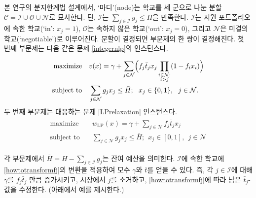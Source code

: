 \documentclass[11pt]{article} %
\newif\ifen
\theoremstyle{definition}
\theoremstyle{definition}
\begin{document}
\ifen In our branch-and-bound framework, a \emph{node} is characterized by a three-way partition of schools $\mathcal{C}= \mathcal{I} \cup \mathcal{O} \cup \mathcal{N}$ satisfying $\sum_{j \in \mathcal{I}} g_j \leq H$. $\mathcal{I}$ consists of schools that are ``in'' the application portfolio ($x_j = 1$), $\mathcal{O}$ consists of those that are ``out'' ($x_j = 0$), and $\mathcal{N}$ consists of those that are ``negotiable.'' 
The choice of partition induces a pair of subproblems. The first subproblem is an instance of Problem \ref{integernlp}, namely
\else
본 연구의 분지한계법 설계에서, `마디'(node)는 학교를 세 군으로 나눈 분할 $\mathcal{C}= \mathcal{I} \cup \mathcal{O} \cup \mathcal{N}$로 묘사한다. 단, $\mathcal{I}$는 $\sum_{j \in \mathcal{I}} g_j \leq H$을 만족한다. $\mathcal{I}$는 지원 포트폴리오에 속한 학교(`in': $x_j = 1$), $\mathcal{O}$는 속하지 않은 학교(`out': $x_j = 0$), 그리고 $\mathcal{N}$은 미결의 학교(`negotiable')로 이루어진다. 분할이 결정되면 부문제의 한 쌍이 결정해진다. 첫 번째 부문제는 다음 같은 문제 \ref{integernlp}의 인스턴스다.
\fi
\begin{align} \label{nodenlpsubproblem}
\begin{split}
\text{maximize}\quad &  v(x) = \gamma + \sum_{j \in \mathcal{N}} \Bigl(f_j \bar t_j x_j \prod_{\substack{i \in \mathcal{N}:\\i > j}} (1 - f_{i} x_i) \Bigr)\\
\text{subject to}\quad & \sum_{j \in \mathcal{N}} g_j x_j \leq \bar H; ~~ x_j \in \{0, 1\},~~j \in \mathcal{N}.
\end{split}
\end{align}
\ifen The second is the corresponding instance of Problem \ref{LPrelaxation}:
\else 두 번째 부문제는 대응하는 문제 \ref{LPrelaxation} 인스턴스다.\fi
\begin{align} \label{nodelprelaxation}
\begin{split}
\text{maximize}\quad &  w_{\mathrm{LP}}(x)= \gamma + \sum_{j \in \mathcal{N}}  f_j \bar t_j  x_j \\
\text{subject to}\quad & \sum_{j \in \mathcal{N}} g_j x_j \leq \bar H; ~~ x_j \in [0, 1],~~j \in \mathcal{N}
\end{split}
\end{align}
\ifen
In both subproblems, $\bar H = H - \sum_{j\in \mathcal{I}} g_j$ denotes the residual budget. The parameters $\gamma$ and $\bar t$ are obtained by iteratively applying the transformation \eqref{howtotransformfj} to the schools in $\mathcal{I}$. For each $j\in \mathcal{I}$,  we increment $\gamma$ by the current value of $f_j \bar t_j$, eliminate $j$ from the market, and update the remaining $\bar t_j$-values using \eqref{howtotransformfj}. (An example is given below.)
\else
각 부문제에서 $\bar H = H - \sum_{j\in \mathcal{I}} g_j$는 잔여 예산을 의미한다. $\mathcal{I}$에 속한 학교에 \eqref{howtotransformfj}의 변환을 적용하여 모수 $\gamma$와 $\bar t$를 얻을 수 있다. 즉, 각 $j\in \mathcal{I}$에 대해 $\gamma$를 $f_j \bar t_j$ 만큼 증가시키고, 시장에서 $j$를 소거하고, \eqref{howtotransformfj}에 따라 남은 $\bar t_j$-값을 수정한다. (아래에서 예를 제시한다.)
\fi
\end{document}
